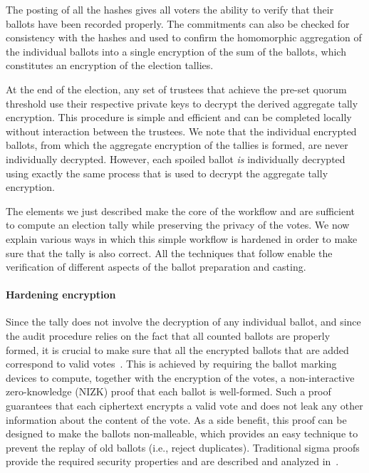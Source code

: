 The posting of all the hashes gives all voters the ability to verify
that their ballots have been recorded properly.  The commitments
can also be checked for consistency with the hashes and used to
confirm the homomorphic aggregation of the individual ballots into a
single encryption of the sum of the ballots, which constitutes an
encryption of the election tallies.

At the end of the election, any set of trustees that achieve the
pre-set quorum threshold use their respective private keys to decrypt
the derived aggregate tally encryption.  This procedure is simple and
efficient and can be completed locally without interaction between the
trustees.  We note that the individual encrypted ballots, from which
the aggregate encryption of the tallies is formed, are never
individually decrypted.  However, each spoiled ballot {\em is}
individually decrypted using exactly the same process that is used to
decrypt the aggregate tally encryption.

The elements we just described make the core of the workflow and are
sufficient to compute an election tally while preserving the privacy
of the votes. We now explain various ways in which this simple
workflow is hardened in order to make sure that the tally is also
correct. All the techniques that follow enable the verification of
different aspects of the ballot preparation and casting.

\paragraph{Hardening encryption}
\label{sec:hardening-encryption}
Since the tally does not involve the decryption of any individual
ballot, and since the audit procedure relies on the fact that all
counted ballots are properly formed, it is crucial to make sure that
all the encrypted ballots that are added correspond to valid
votes~\cite{benaloh-fischer-85}.  This is achieved by requiring the
ballot marking devices to compute, together with the encryption of the
votes, a non-interactive zero-knowledge (NIZK) proof that each ballot
is well-formed. Such a proof guarantees that each ciphertext encrypts
a valid vote and does not leak any other information about the content
of the vote. As a side benefit, this proof can be designed to make the
ballots non-malleable, which provides an easy technique to prevent the
replay of old ballots (i.e., reject duplicates). Traditional sigma
proofs provide the required security properties and are described and
analyzed in~\cite{BPW12}.

